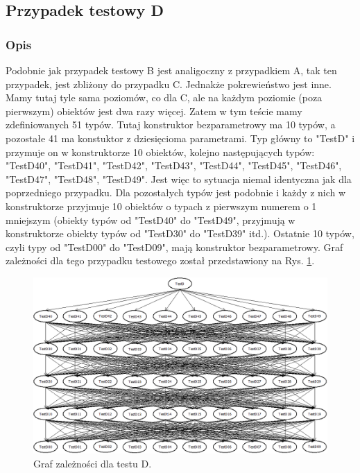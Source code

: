 \documentclass[12pt]{article}
\begin{document}
\subsection{Przypadek testowy D}
\subsubsection{Opis}
Podobnie jak przypadek testowy B jest analigoczny z przypadkiem A, tak ten przypadek, jest zbliżony do przypadku C. Jednakże pokrewieństwo jest inne. Mamy tutaj tyle sama poziomów, co dla C, ale na każdym poziomie (poza pierwszym) obiektów jest dwa razy więcej. Zatem w tym teście mamy zdefiniowanych 51 typów. Tutaj konstruktor bezparametrowy ma 10 typów, a pozostałe 41 ma konstuktor z dziesięcioma parametrami. Typ główny to "TestD" i przymuje on w konstruktorze 10 obiektów, kolejno następujących typów: "TestD40", "TestD41", "TestD42", "TestD43", "TestD44", "TestD45", "TestD46", "TestD47", "TestD48", "TestD49". Jest więc to sytuacja niemal identyczna jak dla poprzedniego przypadku. Dla pozostałych typów jest podobnie i każdy z nich w konstruktorze przyjmuje 10 obiektów o typach z pierwszym numerem o 1 mniejszym (obiekty typów od "TestD40" do "TestD49", przyjmują w konstruktorze obiekty typów od "TestD30" do "TestD39" itd.). Ostatnie 10 typów, czyli typy od "TestD00" do "TestD09", mają konstruktor bezparametrowy. Graf zależności dla tego przypadku testowego został przedstawiony na Rys. \ref{fig:testD}.\\
\begin{figure}[H]
	\begin{center}
  		\includegraphics[width=\linewidth]{TestD.png}
  		\caption{Graf zależności dla testu D.}
  		\label{fig:testD}
	\end{center}
\end{figure}
\end{document}
